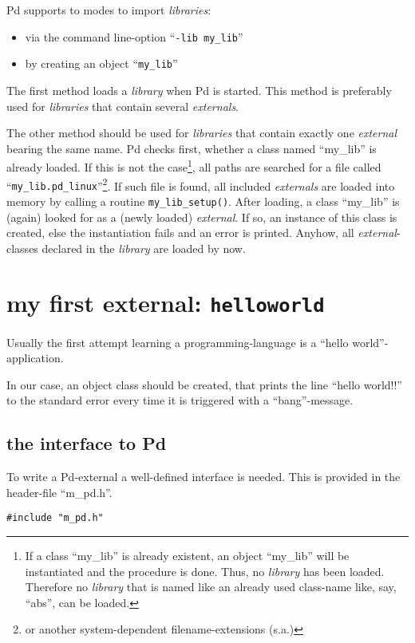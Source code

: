 \documentclass[12pt, a4paper,english,titlepage]{article}
\begin{document}
Pd supports to modes to import {\em libraries}:

\begin{itemize}
\item via the command line-option ``{\tt -lib my\_lib}''
\item by creating an object ``{\tt my\_lib}''
\end{itemize}

The first method loads a {\em library} when Pd is started.
This method is preferably used for {\em libraries} that contain several {\em externals}.

The other method should be used for {\em libraries} that contain exactly
one {\em external} bearing the same name.
Pd checks first, whether a class named ``my\_lib'' is already loaded.
If this is not the case\footnote{
If a class ``my\_lib'' is already existent, an object ``my\_lib'' will be instantiated
and the procedure is done. 
Thus, no {\em library} has been loaded.
Therefore no {\em library} that is named like an already used class-name like, say, ``abs'',
can be loaded.}, all paths are searched for a file called
``{\tt my\_lib.pd\_linux}''\footnote{or another system-dependent filename-extensions (s.a.)}.
If such file is found, all included {\em externals} are loaded into memory by calling a
routine \verb+my_lib_setup()+.
After loading, a class ``my\_lib'' is (again) looked for as a (newly loaded) {\em external}.
If so, an instance of this class is created, else the instantiation fails and an error is
printed.
Anyhow, all {\em external}-classes declared in the {\em library} are loaded by now.


\section{my first external: {\tt helloworld}}
Usually the first attempt learning a programming-language is a ``hello world''-application.

In our case, an object class should be created, that prints the line ``hello world!!'' to
the standard error every time it is triggered with a ``bang''-message.



\subsection{the interface to Pd}
To write a Pd-external a well-defined interface is needed.
This is provided in the header-file ``m\_pd.h''.

\begin{verbatim}
#include "m_pd.h"
\end{verbatim}
\end{document}

